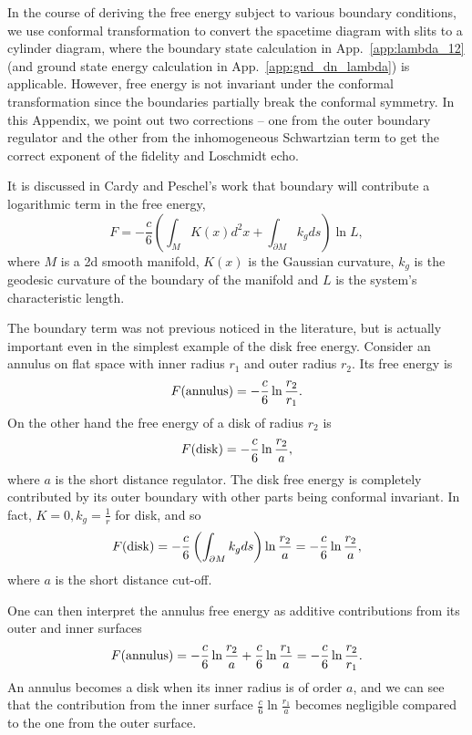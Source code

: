 
In the course of deriving the free energy subject to various boundary conditions, we use conformal transformation to convert the spacetime diagram with slits to a cylinder diagram, where the boundary state calculation in App.~\ref{app:lambda_12} (and ground state energy calculation in App.~\ref{app:gnd_dn_lambda}) is applicable. However, free energy is not invariant under the conformal transformation since the boundaries partially break the conformal symmetry. In this Appendix, we point out two corrections -- one from the outer boundary regulator and the other from the inhomogeneous Schwartzian term to get the correct exponent of the fidelity and Loschmidt echo. 

It is discussed in Cardy and Peschel's work\cite{cardy_finite-size_1988} that boundary will contribute a logarithmic term in the free energy,
\begin{equation}
F = - \frac{c}{6} \left( \int_M  K(x) d^2x + \int_{\partial M} k_g ds \right)  \ln L , 
\end{equation}
where $M$ is a 2d smooth manifold, $K(x)$ is the Gaussian curvature, $k_g$ is the geodesic curvature of the boundary of the manifold and $L$ is the system's characteristic length. 

The boundary term was not previous noticed in the literature, but is actually important even in the simplest example of the disk free energy. Consider an annulus on flat space with inner radius $r_1$ and outer radius $r_2$. Its free energy is
\begin{equation}
F({\rm annulus}) = -  \frac{c}{6} \ln \frac{r_2}{r_1} .
\end{equation}
On the other hand the free energy of a disk of radius $r_2$ is
\begin{equation}
  F( {\rm disk} ) = - \frac{c}{6} \ln \frac{r_2}{a},
\end{equation}
where $a$ is the short distance regulator. The disk free energy is completely contributed by its outer boundary with other parts being conformal invariant. In fact, $K = 0, k_g = \frac{1}{r}$ for disk, and so 
\begin{equation}
F( {\rm disk}  ) = - \frac{c}{6}  \left( \int_{\partial M} k_g ds \right)  \ln \frac{r_2}{a}  = - \frac{c}{6}  \ln \frac{r_2}{a} , 
\end{equation}
where $a$ is the short distance cut-off. 

One can then interpret the annulus free energy as additive contributions from its outer and inner surfaces
\begin{equation}
F( {\rm annulus} ) = -  \frac{c}{6} \ln \frac{r_2}{a} +  \frac{c}{6} \ln \frac{r_1}{a} = - \frac{c}{6} \ln \frac{r_2}{r_1}.
\end{equation}
An annulus becomes a disk when its inner radius is of order $a$, and we can see that the contribution from the inner surface $\frac{c}{6} \ln \frac{r_1}{a}$ becomes negligible compared to the one from the outer surface.  

